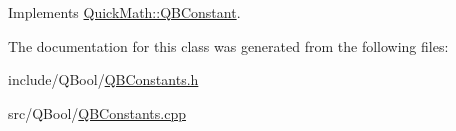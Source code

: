 Implements \hyperlink{classQuickMath_1_1QBConstant_a399a700088d6327765b88652cea43c0e}{Quick\+Math\+::\+Q\+B\+Constant}.



The documentation for this class was generated from the following files\+:\begin{DoxyCompactItemize}
\item 
include/\+Q\+Bool/\hyperlink{QBConstants_8h}{Q\+B\+Constants.\+h}\item 
src/\+Q\+Bool/\hyperlink{QBConstants_8cpp}{Q\+B\+Constants.\+cpp}\end{DoxyCompactItemize}
